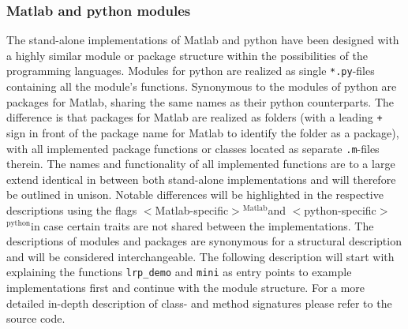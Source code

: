 \documentclass[a4wide]{article}
\newcommand{\mat}{$^\text{Matlab}$}
\newcommand{\py}{$^\text{python}$}
\begin{document}
\begin{itemize}
\begin{itemize}
			\end{itemize}
\end{itemize}


\subsubsection*{Matlab and python modules}
The stand-alone implementations of Matlab and python have been designed with a highly similar module or package structure within the possibilities of the programming languages. Modules for python are realized as single \texttt{*.py}-files containing all the module's functions. Synonymous to the modules of python are packages for Matlab, sharing the same names as their python counterparts. The difference is that packages for Matlab are realized as folders (with a leading \texttt{+} sign in front of the package name for Matlab to identify the folder as a package), with all implemented package functions or classes located as separate \texttt{.m}-files therein. The names and functionality of all implemented functions are to a large extend identical in between both stand-alone implementations and will therefore be outlined in unison. Notable differences will be highlighted in the respective descriptions using the flags $<$Matlab-specific$>$\mat and $<$python-specific$>$\py in case certain traits are not shared between the implementations. The descriptions of modules and packages are synonymous for a structural description and will be considered interchangeable. The following description will start with explaining the functions \texttt{lrp\_demo} and \texttt{mini} as entry points to example implementations first and continue with the module structure. For a more detailed in-depth description of class- and method signatures please refer to the source code. 
\end{document}
